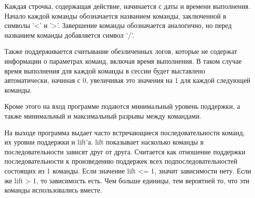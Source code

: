 
Каждая строчка, содержащая действие, начинается с даты и времени выполнения. Начало каждой команды обозначается названием команды, заключенной в символы '<' и '>'. Завершение команды обозначается аналогично, но перед названием команды добавляется символ '/'.

Также поддерживается считывание обезличенных логов, которые не содержат информации о параметрах команд, включая время выполнения. В таком случае время выполнения для каждой команды в сессии будет выставлено автоматически, начиная с 0, увеличивая это значения на 1 для каждой следующей команды.

Кроме этого на вход программе подаются минимальный уровень поддержки, а также минимальный и максимальный разрывы между командами.

На выходе программа выдает часто встречающиеся последовательности команд, их уровни поддержки и lift'а.
lift показывает насколько команды в последовательности зависят друг от друга. 
Считается как отношение поддержки последовательности к произведению поддержек всех подпоследовательностей состоящих из 1 команды. Если значение lift <= 1, значит зависимости нету. Если же lift > 1, то зависимость есть. Чем больше единицы, тем вероятней то, что эти команды использовались вместе.


